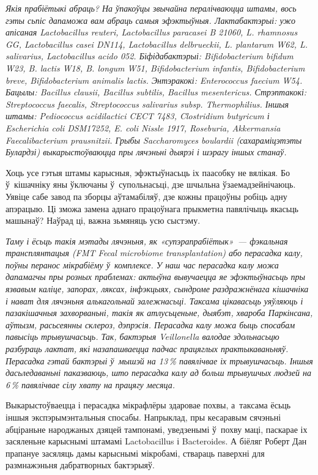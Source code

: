\emph{Якія прабіётыкі абраць? На ўпакоўцы звычайна пералічваюцца штамы, вось гэты сьпіс дапаможа вам абраць самыя эфэктыўныя. Лактабактэрыі: ужо апісаная Lactobacillus reuteri, Lactobacillus paracasei B 21060, L. rhamnosus GG, Lactobacillus casei DN114, Lactobacillus delbrueckii, L. plantarum W62, L. salivarius, Lactobacillus acido 052. Біфідабактэрыі: Bifidobacterium bifidum W23, B. lactis W18, B. longum W51, Bifidobacterium infantis, Bifidobacterium breve, Bifidobacterium animalis lactis. Энтэракокі: Enterococcus faecium W54. Бацылы: Bacillus clausii, Bacillus subtilis, Bacillus mesentericus. Стрэптакокі: Streptococcus faecalis, Streptococcus salivarius subsp. Thermophilius. Іншыя штамы: Pediococcus acidilactici CECT 7483, Clostridium butyricum і Escherichia coli DSM17252, E. coli Nissle 1917, Roseburia, Akkermansia Faecalibacterium prausnitzii. Грыбы Saccharomyces boulardii (сахараміцэтэты Булардзі) выкарыстоўваюцца пры лячэньні дыярэі і шэрагу іншых станаў.}

Хоць усе гэтыя штамы карысныя, эфэктыўнасьць іх паасобку не вялікая. Бо ў~кішачніку яны ўключаны ў~супольнасьці, дзе шчыльна ўзаемадзейнічаюць. Уявіце сабе завод па зборцы аўтамабіляў, дзе кожны працоўны робіць адну апэрацыю. Ці зможа замена аднаго працоўнага прыкметна павялічыць якасьць машынаў? Наўрад ці, важна зьмяняць усю сыстэму.

\emph{Таму і ёсьць такія мэтады лячэньня, як «супэрапрабіётык»~--- фэкальная трансплянтацыя (FMT Fecal microbiome transplantation) або перасадка калу, поўны перанос мікрабіёму ў~комплексе. У наш час перасадка калу можа дапамагчы пры розных праблемах: актыўна вывучаецца яе эфэктыўнасьць пры язвавым каліце, запорах, ляксах, інфэкцыях, сындроме раздражнёнага кішачніка і нават для лячэньня алькагольнай залежнасьці. Таксама цікавасьць уяўляюць і пазакішачныя захворваньні, такія як атлусьценьне, дыябэт, хвароба Паркінсана, аўтызм, расьсеянны склероз, дэпрэсія. Перасадка калу можа быць спосабам павысіць трывушчасьць. Так, бактэрыя Veillonella валодае здольнасьцю разбураць лактат, які назапашваецца падчас працяглых практыкаваньняў. Перасадка гэтай бактэрыі ў~мышэй на 13\,\% павялічвае іх трывушчасьць. Іншыя дасьледаваньні паказваюць, што перасадка калу ад больш трывушчых людзей на 6\,\% павялічвае сілу хвату на працягу месяца.}

Выкарыстоўваецца і перасадка мікрафлёры здаровае похвы, а~таксама ёсьць іншыя экспэрымэнтальныя спосабы. Напрыклад, пры кесаравым сячэньні абціраньне народжаных дзяцей тампонамі, уведзенымі ў~похву маці, паскарае іх засяленьне карыснымі штамамі Lactobacillus і Bacteroides. А біёляг Роберт Дан прапануе засяляць дамы карыснымі мікробамі, ствараць паверхні для размнажэньня дабратворных бактэрыяў.

